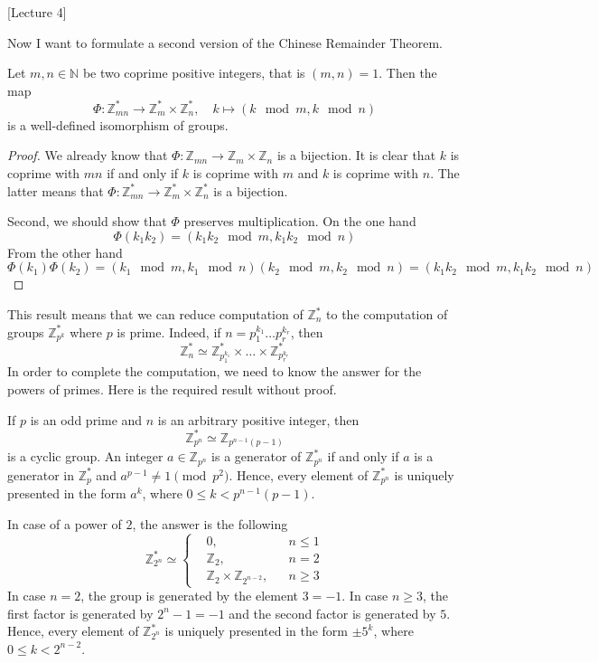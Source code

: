 [Lecture 4]


Now I want to formulate a second version of the Chinese Remainder Theorem.

\begin{claim}\label{claim::ChineseMult}
Let $m, n\in \mathbb N$ be two coprime positive integers, that is $(m,n) = 1$. Then the map
\[
\Phi \colon \mathbb Z_{mn}^* \to \mathbb Z_m^* \times \mathbb Z_n^*,\quad k\mapsto (k\!\!\mod m, k\!\!\mod n)
\]
is a well-defined isomorphism of groups.
\end{claim}
\begin{proof}
We already know that $\Phi\colon\mathbb Z_{mn}\to \mathbb Z_m \times \mathbb Z_n$ is a bijection. It is clear that $k$ is coprime with $mn$ if and only if $k$ is coprime with $m$ and $k$ is coprime with $n$. The latter means that   $\Phi\colon\mathbb Z_{mn}^*\to \mathbb Z_m^* \times \mathbb Z_n^*$ is a bijection.

Second, we should show that $\Phi$ preserves multiplication. On the one hand
\[
\Phi(k_1k_2)  = (k_1k_2\!\!\mod m, k_1k_2\!\!\mod n)
\]
From the other hand
\[
\Phi(k_1)\Phi(k_2) = (k_1\!\!\mod m, k_1\!\!\mod n)(k_2\!\!\mod m, k_2\!\!\mod n) = (k_1k_2\!\!\mod m, k_1k_2\!\!\mod n)
\]
\end{proof}

This result means that we can reduce computation of $\mathbb Z_n^*$ to the computation of groups $\mathbb Z_{p^k}^*$ where $p$ is prime. Indeed, if $n = p_1^{k_1}\ldots p_r^{k_r}$, then
\[
\mathbb Z_n^* \simeq \mathbb Z_{p_1^{k_1}}^*\times\ldots \times \mathbb Z_{p_r^{k_r}}^*
\]
In order to complete the computation, we need to know the answer for the powers of primes. Here is the required result without proof.

\begin{claim}
If $p$ is an odd prime and $n$ is an arbitrary positive integer, then
\[
\mathbb Z_{p^n}^* \simeq \mathbb Z_{p^{n-1}(p-1)}
\]
is a cyclic group. An integer $a\in \mathbb Z_{p^n}$ is a generator of $\mathbb Z_{p^n}^* $ if and only if $a$ is a generator in $\mathbb Z_p^*$ and $a^{p-1}\neq 1 \pmod{ p^2}$. Hence, every element of $\mathbb Z_{p^n}^*$ is uniquely presented in the form $a^k$, where $0\leqslant k < p^{n-1}(p-1)$.

In case of a power of $2$, the answer is the following
\[
\mathbb Z_{2^n}^*\simeq
\left\{
\begin{aligned}
&0, & &n\leqslant 1\\
&\mathbb Z_2, & &n = 2\\
&\mathbb Z_2\times \mathbb Z_{2^{n-2}}, & &n\geqslant 3
\end{aligned}
\right.
\]
In case $n = 2$, the group is generated by the element $3 = -1$. In case $n \geqslant 3$, the first factor is generated by $2^n - 1 = -1$ and the second factor is generated by $5$. Hence, every element of $\mathbb Z_{2^n}^*$ is uniquely presented in the form $\pm 5^k$, where $0\leqslant k < 2^{n-2}$.
\end{claim}

